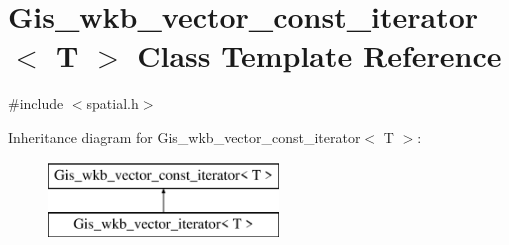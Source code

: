 \hypertarget{classGis__wkb__vector__const__iterator}{}\section{Gis\+\_\+wkb\+\_\+vector\+\_\+const\+\_\+iterator$<$ T $>$ Class Template Reference}
\label{classGis__wkb__vector__const__iterator}


{\ttfamily \#include $<$spatial.\+h$>$}

Inheritance diagram for Gis\+\_\+wkb\+\_\+vector\+\_\+const\+\_\+iterator$<$ T $>$\+:\begin{figure}[H]
\begin{center}
\leavevmode
\includegraphics[height=2.000000cm]{classGis__wkb__vector__const__iterator}
\end{center}
\end{figure}
